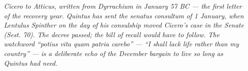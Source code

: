 
\textit{Cicero to Atticus, written from Dyrrachium in January
57 BC --- the first letter of the recovery year. Quintus has
sent the senatus consultum of 1 January, when Lentulus
Spinther on the day of his consulship moved Cicero's case in
the Senate (\textit{Sest.} 70). The decree passed; the bill
of recall would have to follow. The watchword
``\textit{potius vita quam patria carebo}'' --- ``I shall lack
life rather than my country'' --- is a deliberate echo of the
December bargain to live so long as Quintus had need.}
